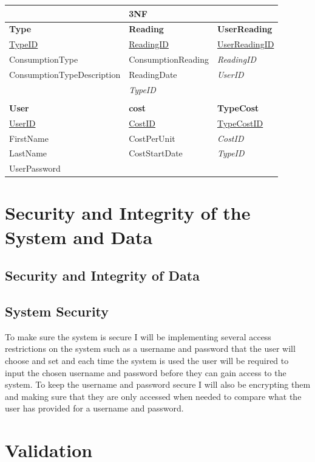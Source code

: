 \begin{center}
	\begin{tabular}{|p{5cm}|p{4cm}|p{3.5cm}|}
		\hline
		 & \textbf{3NF} & \\ \hline
		\textbf{Type} & \textbf{Reading} & \textbf{UserReading} \\ \hline
		\underline{TypeID} & \underline{ReadingID} & \underline{UserReadingID} \\ \hline
		ConsumptionType & ConsumptionReading & \emph{ReadingID} \\ \hline
		ConsumptionTypeDescription & ReadingDate & \emph{UserID} \\ \hline
		 & \emph{TypeID} & \\ \hline
		 & & \\ \hline
		\textbf{User} & \textbf{cost} & \textbf{TypeCost} \\ \hline
		\underline{UserID} & \underline{CostID} & \underline{TypeCostID} \\ \hline
		FirstName & CostPerUnit & \emph{CostID} \\ \hline
		LastName & CostStartDate & \emph{TypeID} \\ \hline
		UserPassword & & \\ \hline
	\end{tabular}
\end{center}

\section{Security and Integrity of the System and Data}

\subsection{Security and Integrity of Data}

\subsection{System Security}
To make sure the system is secure I will be implementing several access restrictions on the system such as a username and password that the user will choose and  set and each time the system is used the user will be required to input the chosen username and password before they can gain access to the system. To keep the username and password secure I will also be encrypting them and making sure that they are only accessed when needed to compare what the user has provided for a username and password.
\section{Validation}

